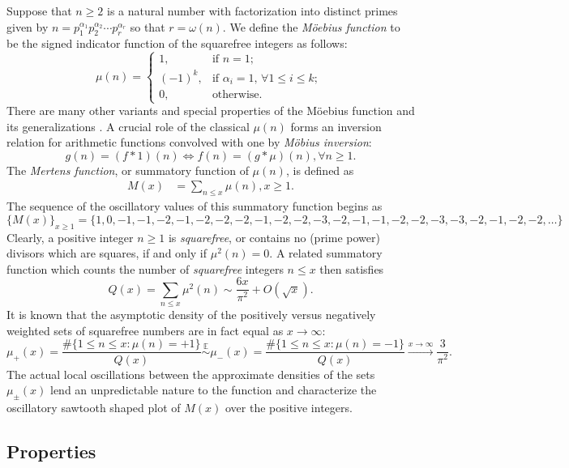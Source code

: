 \documentclass[11pt,reqno,a4letter]{article}
\numberwithin{figure}{section}
\numberwithin{table}{section}
\newcommand{\cf}{\textit{cf.\ }}
\newcommand{\seqnum}[1]{\href{http://oeis.org/#1}{\color{ProcessBlue}{\underline{#1}}}}
\theoremstyle{plain}
\numberwithin{theorem}{section}
\theoremstyle{definition}
\begin{document}
Suppose that $n \geq 2$ is a natural number with factorization into 
distinct primes given by 
$n = p_1^{\alpha_1} p_2^{\alpha_2} \cdots p_r^{\alpha_r}$ so that $r = \omega(n)$. 
We define the \emph{M\"oebius function} to be the signed indicator function 
of the squarefree integers as follows: 
\[
\mu(n) = \begin{cases} 
     1, & \text{if $n = 1$; } \\ 
     (-1)^k, & \text{if $\alpha_i = 1$, $\forall 1 \leq i \leq k$; } \\ 
     0, & \text{otherwise.} 
     \end{cases} 
\]
There are many other variants and special properties of the M\"oebius function 
and its generalizations \cite[\cf \S 2]{HANDBOOKNT-2004}. 
A crucial role of the classical $\mu(n)$ forms an inversion relation 
for arithmetic functions convolved with one by \emph{M\"obius inversion}: 
\[
g(n) = (f \ast 1)(n) \iff f(n) = (g \ast \mu)(n), \forall n \geq 1. 
\]
The \emph{Mertens function}, or summatory function of $\mu(n)$, is defined as 
\begin{align*} 
M(x) & = \sum_{n \leq x} \mu(n), x \geq 1. 
\end{align*} 
The sequence of the oscillatory values of this summatory function begins as 
\cite[\seqnum{A002321}]{OEIS} 
\[
\{M(x)\}_{x \geq 1} = \{1, 0, -1, -1, -2, -1, -2, -2, -2, -1, -2, -2, -3, -2, 
     -1, -1, -2, -2, -3, -3, -2, -1, -2, -2, \ldots\}
\]
Clearly, a positive integer $n \geq 1$ is \emph{squarefree}, or contains no (prime power) divisors which are 
squares, if and only if $\mu^2(n) = 0$. 
A related summatory function which counts the 
number of \emph{squarefree} integers $n \leq x$ then satisfies 
\cite[\S 18.6]{HARDYWRIGHT} \cite[\seqnum{A013928}]{OEIS} 
\[ 
Q(x) = \sum_{n \leq x} \mu^2(n) \sim \frac{6x}{\pi^2} + O\left(\sqrt{x}\right). 
\] 
It is known that the asymptotic density of the positively versus negatively 
weighted sets of squarefree numbers are in fact equal as $x \rightarrow \infty$: 
\[
\mu_{+}(x) = \frac{\#\{1 \leq n \leq x: \mu(n) = +1\}}{Q(x)} \overset{\mathbb{E}}{\sim} 
     \mu_{-}(x) = \frac{\#\{1 \leq n \leq x: \mu(n) = -1\}}{Q(x)} 
     \xrightarrow{x \rightarrow \infty} \frac{3}{\pi^2}. 
\]
The actual local oscillations between the approximate densities of the sets 
$\mu_{\pm}(x)$ lend an unpredictable nature to the function and characterize the 
oscillatory sawtooth shaped plot of $M(x)$ over the positive integers. 

\subsection{Properties} 
\end{document}
